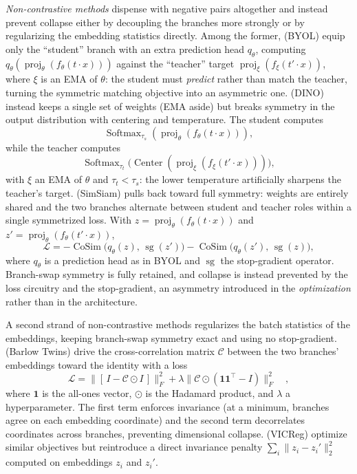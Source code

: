\documentclass[mathematics,review,submit,moreauthors]{Definitions/mdpi}
\begin{document}
\emph{Non-contrastive methods} dispense with negative pairs altogether and instead prevent collapse either by decoupling the branches more strongly or by regularizing the embedding statistics directly.
Among the former, \citet{grill2020} (BYOL) equip only the ``student'' branch with an extra prediction head $q_\theta$, computing $q_\theta(\operatorname{proj}_\theta(f_\theta(t\cdot x)))$ against the ``teacher'' target $\operatorname{proj}_\xi(f_\xi(t'\cdot x))$, where $\xi$ is an EMA of $\theta$: the student must \emph{predict} rather than match the teacher, turning the symmetric matching objective into an asymmetric one.
\citet{caron2021} (DINO) instead keeps a single set of weights (EMA aside) but breaks symmetry in the output distribution with centering and temperature.
The student computes
\[
    \operatorname{Softmax}_{\tau_s}(\operatorname{proj}_{\theta}(f_\theta(t\cdot x))),
\]
while the teacher computes
\[
    \operatorname{Softmax}_{\tau_t}
    \bigl(\operatorname{Center}(\operatorname{proj}_{\xi}(f_\xi(t'\cdot x)))\bigr),
\]
with $\xi$ an EMA of $\theta$ and $\tau_t<\tau_s$: the lower temperature artificially sharpens the teacher's target.
\citet{chen2020a} (SimSiam) pulls back toward full symmetry: weights are entirely shared and the two branches alternate between student and teacher roles within a single symmetrized loss.
With $z=\operatorname{proj}_\theta(f_\theta(t\cdot x))$ and $z'=\operatorname{proj}_\theta(f_\theta(t'\cdot x))$,
\[
\mathcal{L}=-\operatorname{CoSim}\big(q_\theta(z),\,\operatorname{sg}(z')\big)-\operatorname{CoSim}\big(q_\theta(z'),\,\operatorname{sg}(z)\big),
\]
where $q_\theta$ is a prediction head as in BYOL and $\operatorname{sg}$ the stop-gradient operator.
Branch-swap symmetry is fully retained, and collapse is instead prevented by the loss circuitry and the stop-gradient, an asymmetry introduced in the \emph{optimization} rather than in the architecture.

A second strand of non-contrastive methods regularizes the batch statistics of the embeddings, keeping branch-swap symmetry exact and using no stop-gradient.
\citet{zbontar2021p3icml} (Barlow Twins) drive the cross-correlation matrix $\mathcal{C}$ between the two branches' embeddings toward the identity with a loss
\[
\mathcal{L}=\big\|[\,I-\mathcal{C}\odot I\,]\big\|_F^2+\lambda\big\|\mathcal{C}\odot(\boldsymbol 1\boldsymbol 1^\top-I)\big\|_F^2\quad ,
\]
where $\boldsymbol{1}$ is the all-ones vector, $\odot$ is the Hadamard product, and $\lambda$ a hyperparameter.
The first term enforces invariance (at a minimum, branches agree on each embedding coordinate) and the second term decorrelates coordinates across branches, preventing dimensional collapse.
\citet{bardes2022} (VICReg) optimize similar objectives but reintroduce a direct invariance penalty $\sum_i \lVert z_i-z_i'\rVert_2^2$ computed on embeddings $z_i$ and $z_i'$. 
\end{document}
